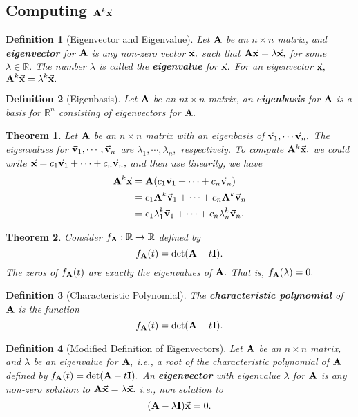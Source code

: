 \documentclass[12pt, a4paper]{article}
\newtheorem{thm}{Theorem}[subsection]
\newtheorem{df}{Definition}[subsection]
\def\R{{\mathbb{R}}}
\def\vecx{\va{x}}
\def\vecv{\va{v}}
\def\matrixA{\vb{A}}
\def\matrixI{\vb{I}}
\begin{document}
\subsection{Computing $\matrixA^k\vecx$}
\begin{df}[Eigenvector and Eigenvalue]
	Let $\matrixA$ be an $n\times n$ matrix, and \textbf{eigenvector} for $\matrixA$ is any non-zero vector $\vecx,$ such that $\matrixA\vecx=\lambda\vecx,$ for some $\lambda\in\R.$ The number $\lambda$ is called the \textbf{eigenvalue} for $\vecx.$ For an eigenvector $\vecx,$ $\matrixA^k\vecx=\lambda^k\vecx.$
\end{df}
\begin{df}[Eigenbasis]
	Let $\matrixA$ be an $nt\times n$ matrix, an \textbf{eigenbasis} for $\matrixA$ is a basis for $\R^n$ consisting of eigenvectors for $\matrixA.$	
\end{df}
\begin{thm}
	Let $\matrixA$ be an $n\times n$ matrix with an eigenbasis of $\vecv_1,\cdots\vecv_n.$ The eigenvalues for $\vecv_1,\cdots,\vecv_n$ are $\lambda_1,\cdots,\lambda_n,$ respectively. To compute $\matrixA^k\vecx,$ we could write $\vecx=c_1\vecv_1+\cdots+c_n\vecv_n,$ and then use linearity, we have \[\begin{aligned}\matrixA^k\vecx&=\matrixA\qty(c_1\vecv_1+\cdots+c_n\vecv_n)\\&=c_1\matrixA^k\vecv_1+\cdots+c_n\matrixA^{k}\vecv_n\\&=c_1\lambda_1^k\vecv_1+\cdots+c_n\lambda_n^k\vecv_n.\end{aligned}\]	
\end{thm}
\begin{thm}
	Consider $f_{\matrixA}:\R\to\R$ defined by \[f_{\matrixA}(t)=\det(\matrixA-t\matrixI).\] The zeros of $f_{\matrixA}(t)$ are exactly the eigenvalues of $\matrixA.$ That is, $f_{\matrixA}(\lambda)=0.$
\end{thm}
\begin{df}[Characteristic Polynomial]
	The \textbf{characteristic polynomial} of $\matrixA$ is the function \[f_{\matrixA}(t)=\det(\matrixA-t\matrixI).\]	
\end{df}
\begin{df}[Modified Definition of Eigenvectors]
	Let $\matrixA$ be an $n\times n$ matrix, and $\lambda$ be an eigenvalue for $\matrixA,$ i.e., a root of the characteristic polynomial of $\matrixA$ defined by $f_{\matrixA}(t)=\det(\matrixA-t\matrixI).$ An \textbf{eigenvector} with eigenvalue $\lambda$ for $\matrixA$ is any non-zero solution to $\matrixA\vecx=\lambda\vecx.$ i.e., non solution to \[(\matrixA-\lambda\matrixI)\vecx=0.\]
\end{df}
\end{document}
